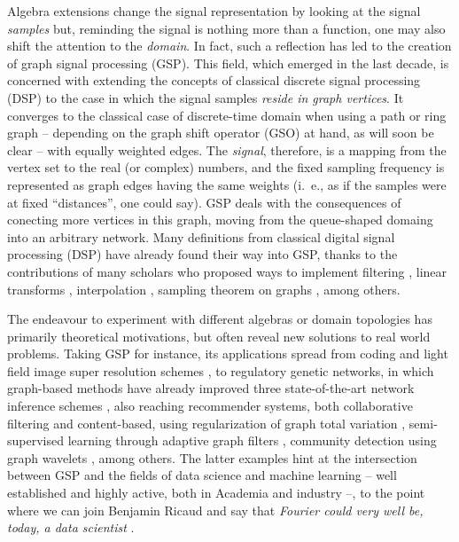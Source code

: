 Algebra extensions change the signal representation by looking at the signal \textit{samples} but, reminding the signal is nothing more than a function, one may also shift the attention to the \textit{domain}. In fact, such a reflection has led to the creation of graph signal processing (GSP). This field, which emerged in the last decade, is concerned with extending the concepts of classical discrete signal processing (DSP) to the case in which the signal samples \textit{reside in graph vertices}. It converges to the classical case of discrete-time domain when using a path or ring graph -- depending on the graph shift operator (GSO) at hand, as will soon be clear -- with equally weighted edges. The \textit{signal}, therefore, is a mapping from the vertex set to the real (or complex) numbers, and the fixed sampling frequency is represented as graph edges having the same weights (i.~e., as if the samples were at fixed ``distances'', one could say). GSP deals with the consequences of conecting more vertices in this graph, moving from the queue-shaped domaing into an arbitrary network. Many definitions from classical digital signal processing (DSP) have already found their way into GSP, thanks to the contributions of many scholars who proposed ways to implement filtering \cite{sandryhaila2013filters}, linear transforms \cite{sandryhaila2013gft,sardellitti2017graph}, interpolation \cite{segarra2015interpolation}, sampling theorem on graphs \cite{wang2015generalized,chen2016signal,tsitsvero2016signals}, among others.

The endeavour to experiment with different algebras or domain topologies has primarily theoretical motivations, but often reveal new solutions to real world problems. Taking GSP for instance, its applications spread from coding \cite{su2017graph} and light field image super resolution schemes \cite{rossi2017graph}, to regulatory genetic networks, in which graph-based methods have already improved three state-of-the-art network inference schemes \cite{pirayre2015brane,pirayre2017brane}, also reaching recommender systems, both collaborative filtering and content-based, using regularization of graph total variation \cite{benzi2016song}, semi-supervised learning through adaptive graph filters \cite{chen2014semi}, community detection using graph wavelets \cite{tremblay2014graph}, among others. The latter examples hint at the intersection between GSP and the fields of data science and machine learning -- well established and highly active, both in Academia and industry --, to the point where we can join Benjamin Ricaud and say that \emph{Fourier could very well be, today, a data scientist} \cite{ricaud2019fourier}.


